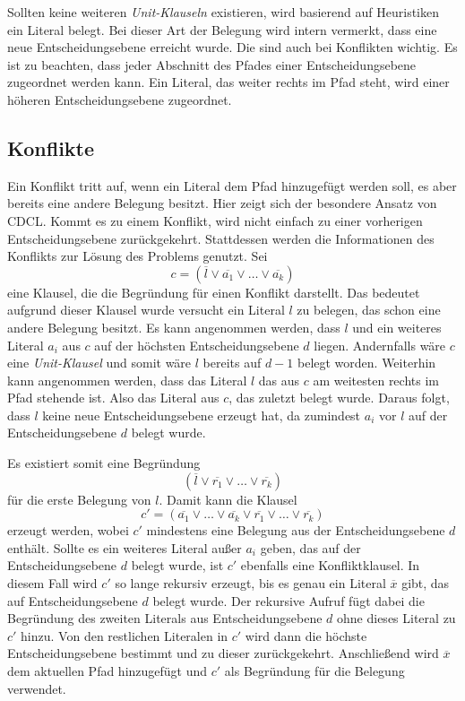 Sollten keine weiteren \emph{Unit-Klauseln} existieren, wird basierend auf Heuristiken ein Literal belegt.
Bei dieser Art der Belegung wird intern vermerkt, dass eine neue Entscheidungsebene erreicht wurde.
Die sind auch bei Konflikten wichtig.
Es ist zu beachten, dass jeder Abschnitt des Pfades einer Entscheidungsebene zugeordnet werden kann.
Ein Literal, das weiter rechts im Pfad steht, wird einer höheren Entscheidungsebene zugeordnet.

\subsection{Konflikte}
Ein Konflikt tritt auf, wenn ein Literal dem Pfad hinzugefügt werden soll, es aber bereits eine andere Belegung besitzt.
Hier zeigt sich der besondere Ansatz von CDCL.
Kommt es zu einem Konflikt, wird nicht einfach zu einer vorherigen Entscheidungsebene zurückgekehrt. 
Stattdessen werden die Informationen des Konflikts zur Lösung des Problems genutzt.
Sei
\[
c = (\overline{l} \lor \overline{a_1} \lor \ldots \lor \overline{a_k})
\]
eine Klausel, die die Begründung für einen Konflikt darstellt. 
Das bedeutet aufgrund dieser Klausel wurde versucht ein Literal \(l\) zu belegen, das schon eine andere Belegung besitzt.
Es kann angenommen werden, dass \(l\) und ein weiteres Literal \(a_i\) aus \(c\) auf der höchsten Entscheidungsebene \(d\) liegen.
Andernfalls wäre \(c\) eine \emph{Unit-Klausel} und somit wäre \(l\) bereits auf \(d-1\) belegt worden.
Weiterhin kann angenommen werden, dass das Literal \(l\) das aus \(c\) am weitesten rechts im Pfad stehende ist. Also das Literal aus \(c\), das zuletzt belegt wurde.
Daraus folgt, dass \(l\) keine neue Entscheidungsebene erzeugt hat, da zumindest \(a_i\) vor \(l\) auf der Entscheidungsebene \(d\) belegt wurde.

Es existiert somit eine Begründung
\[
(\overline{l} \lor \overline{r_1} \lor \ldots \lor \overline{r_k})
\]
für die erste Belegung von \(l\).
Damit kann die Klausel
\[
c' = (\overline{a_1} \lor \ldots \lor \overline{a_k} \lor \overline{r_1} \lor \ldots \lor \overline{r_k})
\]
erzeugt werden, wobei \(c'\) mindestens eine Belegung aus der Entscheidungsebene \(d\) enthält.
Sollte es ein weiteres Literal außer \(a_i\) geben, das auf der Entscheidungsebene \(d\) belegt wurde, ist \(c'\) ebenfalls eine Konfliktklausel.
In diesem Fall wird \(c'\) so lange rekursiv erzeugt, bis es genau ein Literal \(\overline{x}\) gibt, das auf Entscheidungsebene \(d\) belegt wurde.
Der rekursive Aufruf fügt dabei die Begründung des zweiten Literals aus Entscheidungsebene \(d\) ohne dieses Literal zu \(c'\) hinzu.
Von den restlichen Literalen in \(c'\) wird dann die höchste Entscheidungsebene bestimmt und zu dieser zurückgekehrt.
Anschließend wird \(\overline{x}\) dem aktuellen Pfad hinzugefügt und \(c'\) als Begründung für die Belegung verwendet.



